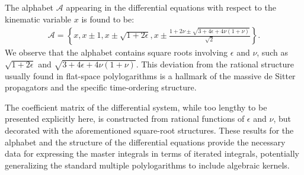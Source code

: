 \documentclass[a4paper]{article}
\begin{document}
The alphabet $\mathcal{A}$ appearing in the differential equations with respect to the kinematic variable $x$ is found to be:
\begin{align}
	\mathcal{A} = \left\{ x, x\pm 1, x\pm \sqrt{1+2\epsilon}, x \pm \frac{1+2\nu \pm \sqrt{3+4\epsilon+4\nu(1+\nu)}}{\sqrt{2}} \right\}.
\end{align}
We observe that the alphabet contains square roots involving $\epsilon$ and $\nu$, such as $\sqrt{1+2\epsilon}$ and $\sqrt{3+4\epsilon+4\nu(1+\nu)}$.
This deviation from the rational structure usually found in flat-space polylogarithms is a hallmark of the massive de Sitter propagators and the specific time-ordering structure.

The coefficient matrix of the differential system, while too lengthy to be presented explicitly here, is constructed from rational functions of $\epsilon$ and $\nu$, but decorated with the aforementioned square-root structures.
These results for the alphabet and the structure of the differential equations provide the necessary data for expressing the master integrals in terms of iterated integrals, potentially generalizing the standard multiple polylogarithms to include algebraic kernels.
\end{document}
